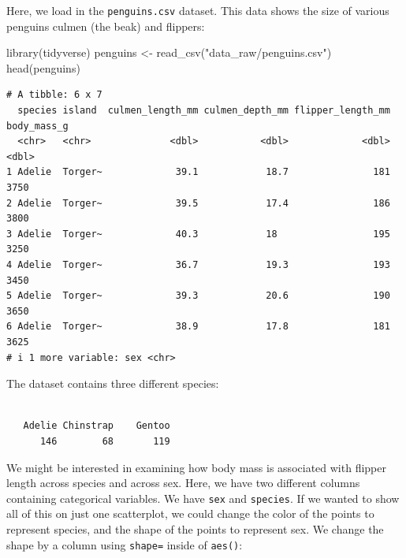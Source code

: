 \documentclass[
  letterpaper,
  DIV=11,
  numbers=noendperiod]{scrreprt}
\newenvironment{Shaded}{\begin{snugshade}}{\end{snugshade}}
\newcommand{\FunctionTok}[1]{\textcolor[rgb]{0.28,0.35,0.67}{#1}}
\newcommand{\NormalTok}[1]{\textcolor[rgb]{0.00,0.23,0.31}{#1}}
\newcommand{\OtherTok}[1]{\textcolor[rgb]{0.00,0.23,0.31}{#1}}
\newcommand{\SpecialCharTok}[1]{\textcolor[rgb]{0.37,0.37,0.37}{#1}}
\newcommand{\StringTok}[1]{\textcolor[rgb]{0.13,0.47,0.30}{#1}}
\begin{document}
Here, we load in the \texttt{penguins.csv} dataset. This data shows the
size of various penguins culmen (the beak) and flippers:

\begin{Shaded}
\begin{Highlighting}[]
\FunctionTok{library}\NormalTok{(tidyverse)}
\NormalTok{penguins }\OtherTok{\textless{}{-}} \FunctionTok{read\_csv}\NormalTok{(}\StringTok{"data\_raw/penguins.csv"}\NormalTok{)}
\FunctionTok{head}\NormalTok{(penguins)}
\end{Highlighting}
\end{Shaded}

\begin{verbatim}
# A tibble: 6 x 7
  species island  culmen_length_mm culmen_depth_mm flipper_length_mm body_mass_g
  <chr>   <chr>              <dbl>           <dbl>             <dbl>       <dbl>
1 Adelie  Torger~             39.1            18.7               181        3750
2 Adelie  Torger~             39.5            17.4               186        3800
3 Adelie  Torger~             40.3            18                 195        3250
4 Adelie  Torger~             36.7            19.3               193        3450
5 Adelie  Torger~             39.3            20.6               190        3650
6 Adelie  Torger~             38.9            17.8               181        3625
# i 1 more variable: sex <chr>
\end{verbatim}

The dataset contains three different species:

\begin{Shaded}
\end{Shaded}

\begin{verbatim}

   Adelie Chinstrap    Gentoo 
      146        68       119 
\end{verbatim}

We might be interested in examining how body mass is associated with
flipper length across species and across sex. Here, we have two
different columns containing categorical variables. We have \texttt{sex}
and \texttt{species}. If we wanted to show all of this on just one
scatterplot, we could change the color of the points to represent
species, and the shape of the points to represent sex. We change the
shape by a column using \texttt{shape=} inside of \texttt{aes()}:
\end{document}

